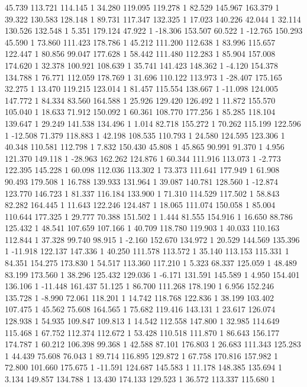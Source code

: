 	45.739 113.721 114.145 1
	34.280 119.095 119.278 1
	82.529 145.967 163.379 1
	39.322 130.583 128.148 1
	89.731 117.347 132.325 1
	17.023 140.226 42.044 1
	32.114 130.526 132.548 1
	5.351 179.124 47.922 1
	-18.306 153.507 60.522 1
	-12.765 150.293 45.590 1
	73.860 111.423 178.786 1
	45.212 111.200 112.638 1
	83.996 115.657 122.447 1
	80.856 99.047 177.628 1
	58.442 111.480 112.283 1
	85.904 157.008 174.620 1
	32.378 100.921 108.639 1
	35.741 141.423 148.362 1
	-4.120 154.378 134.788 1
	76.771 112.059 178.769 1
	31.696 110.122 113.973 1
	-28.407 175.165 32.275 1
	13.470 119.215 123.014 1
	81.457 115.554 138.667 1
	-11.098 124.005 147.772 1
	84.334 83.560 164.588 1
	25.926 129.420 126.492 1
	11.872 155.570 105.040 1
	18.633 71.912 150.092 1
	60.361 108.770 177.256 1
	85.285 118.104 139.647 1
	29.249 141.538 134.496 1
	1.014 82.718 155.272 1
	70.262 115.199 122.596 1
	-12.508 71.379 118.883 1
	42.198 108.535 110.793 1
	24.580 124.595 123.306 1
	40.348 110.581 112.798 1
	7.832 150.430 45.808 1
	45.865 90.991 91.370 1
	4.956 121.370 149.118 1
	-28.963 162.262 124.876 1
	60.344 111.916 113.073 1
	-2.773 122.395 145.228 1
	60.098 112.036 113.302 1
	73.373 111.641 177.949 1
	61.908 90.493 179.508 1
	16.788 139.933 131.964 1
	39.087 140.781 128.560 1
	-12.874 123.770 146.723 1
	81.337 116.184 133.900 1
	71.310 114.529 117.502 1
	58.843 82.282 164.445 1
	11.643 122.246 124.487 1
	18.065 111.074 150.058 1
	85.004 110.644 177.325 1
	29.777 70.388 151.502 1
	1.444 81.555 154.916 1
	16.650 88.786 125.432 1
	48.541 107.659 107.166 1
	40.709 118.780 119.903 1
	40.033 110.163 112.844 1
	37.328 99.740 98.915 1
	-2.160 152.670 134.972 1
	20.529 144.569 135.396 1
	-11.918 122.137 147.336 1
	40.250 111.578 113.572 1
	35.140 113.153 115.331 1
	84.351 154.275 173.830 1
	54.517 113.360 117.210 1
	5.323 68.337 125.059 1
	48.489 83.199 173.560 1
	38.296 125.432 129.036 1
	-6.171 131.591 145.589 1
	4.950 154.401 136.106 1
	-11.448 161.437 51.125 1
	86.700 111.268 178.190 1
	6.956 152.246 135.728 1
	-8.990 72.061 118.201 1
	14.742 118.768 122.836 1
	38.199 103.402 107.475 1
	45.562 75.608 164.565 1
	75.682 119.416 143.131 1
	23.617 126.074 128.938 1
	54.935 109.847 109.813 1
	14.542 112.558 147.800 1
	32.985 114.649 115.468 1
	67.752 112.374 112.672 1
	53.428 110.518 111.870 1
	86.643 156.177 174.787 1
	60.212 106.398 99.368 1
	42.588 87.101 176.803 1
	26.683 111.343 125.283 1
	44.439 75.608 76.043 1
	89.714 116.895 129.872 1
	67.758 170.816 157.982 1
	72.800 101.660 175.675 1
	-11.591 124.687 145.583 1
	11.178 148.385 135.694 1
	3.134 149.857 134.788 1
	13.430 174.133 129.523 1
	36.572 113.337 115.680 1
